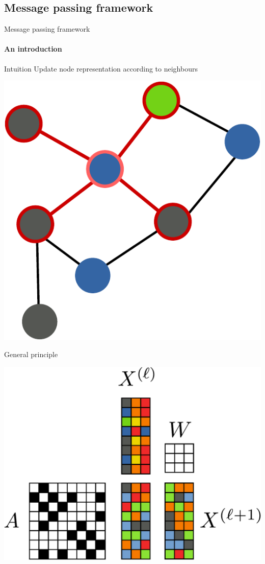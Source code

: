 \documentclass[11pt]{beamer}
\begin{document}
\subsection{Message passing framework}
\begin{frame}{Message passing framework}
  \framesubtitle{An introduction}
  \begin{block}{Intuition}
    Update node representation according to neighbours
    \begin{center}
      \includegraphics[height=0.5\textheight]{mpnn_1}
    \end{center}
  \end{block}
    
\end{frame}
\begin{frame}{General principle}
  \begin{center}
    \includegraphics[width=\textwidth]{mpnn_2}
  \end{center}

\end{frame}
\end{document}
